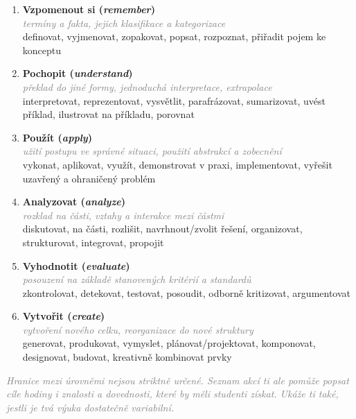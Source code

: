 \documentclass[twoside,openany]{book}
\newcommand{\note}[1]{\textcolor{gray}{\small\itshape #1}}
\begin{document}
\begin{enumerate}[leftmargin=*]
\item \textbf{Vzpomenout si (\textit{remember})}\\
\note{termíny a fakta, jejich klasifikace a kategorizace}\\
{\small definovat, vyjmenovat, zopakovat, popsat, rozpoznat, přiřadit pojem ke konceptu}

\item \textbf{Pochopit (\textit{understand})}\\
\note{překlad do jiné formy, jednoduchá interpretace, extrapolace}\\
{\small interpretovat, reprezentovat, vysvětlit, parafrázovat, sumarizovat, uvést příklad, ilustrovat na příkladu, porovnat}

\item \textbf{Použít (\textit{apply})}\\
\note{užití postupu ve správné situaci, použití abstrakcí a zobecnění}\\
{\small vykonat, aplikovat, využít, demonstrovat v praxi, implementovat, vyřešit uzavřený a ohraničený problém}

\item \textbf{Analyzovat (\textit{analyze})}\\
\note{rozklad na části, vztahy a interakce mezi částmi}\\
{\small diskutovat,  na části, rozlišit, navrhnout/zvolit řešení, organizovat, strukturovat, integrovat, propojit}

\item \textbf{Vyhodnotit (\textit{evaluate})}\\
\note{posouzení na základě stanovených kritérií a standardů}\\
{\small zkontrolovat, detekovat, testovat, posoudit, odborně kritizovat, argumentovat}

\item \textbf{Vytvořit (\textit{create})}\\
\note{vytvoření nového celku, reorganizace do nové struktury}\\
{\small generovat, produkovat, vymyslet, plánovat/projektovat, komponovat, designovat, budovat, kreativně kombinovat prvky}
\end{enumerate}

\note{Hranice mezi úrovněmi nejsou striktně určené. Seznam akcí ti ale pomůže popsat cíle hodiny i znalosti a dovednosti, které by měli studenti získat. Ukáže ti také, jestli je tvá výuka dostatečně variabilní.}
\end{document}
